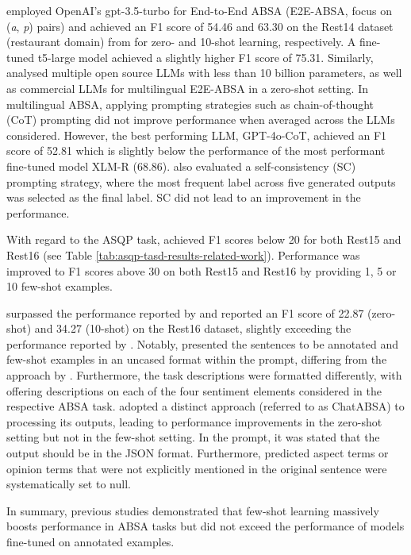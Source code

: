 \citet{zhang2024sentiment} employed OpenAI's gpt-3.5-turbo \citep{brown2020language} for End-to-End ABSA (E2E-ABSA, focus on (\textit{a}, \textit{p}) pairs) and achieved an F1 score of 54.46 and 63.30 on the Rest14 dataset (restaurant domain) from \citet{pontiki2014semeval} for zero- and 10-shot learning, respectively. A fine-tuned t5-large model \citep{raffel2020exploring} achieved a slightly higher F1 score of 75.31. Similarly, \citet{wu2024evaluating} analysed multiple open source LLMs with less than 10 billion parameters, as well as commercial LLMs for multilingual E2E-ABSA in a zero-shot setting. In multilingual ABSA, applying prompting strategies such as chain-of-thought (CoT) prompting did not improve performance when averaged across the LLMs considered. However, the best performing LLM, GPT-4o-CoT, achieved an F1 score of 52.81 which is slightly below the performance of the most performant fine-tuned model XLM-R \citep{conneau2019unsupervised} (68.86). \citet{wu2024evaluating} also evaluated a self-consistency (SC) prompting strategy, where the most frequent label across five generated outputs was selected as the final label. SC did not lead to an improvement in the performance.

With regard to the ASQP task, \citet{zhang2024sentiment} achieved F1 scores below 20 for both Rest15 and Rest16 (see Table \ref{tab:asqp-tasd-results-related-work}). Performance was improved to F1 scores above 30 on both Rest15 and Rest16 by providing 1, 5 or 10 few-shot examples.

\citet{gou2023mvp} surpassed the performance reported by \citet{zhang2024sentiment} and reported an F1 score of 22.87 (zero-shot) and 34.27 (10-shot) on the Rest16 dataset, slightly exceeding the performance reported by \citet{zhang2024sentiment}. Notably, \citet{gou2023mvp} presented the sentences to be annotated and few-shot examples in an uncased format within the prompt, differing from the approach by \citet{zhang2024sentiment}. Furthermore, the task descriptions were formatted differently, with \citet{gou2023mvp} offering descriptions on each of the four sentiment elements considered in the respective ABSA task. \citet{bai2024compound} adopted a distinct approach (referred to as ChatABSA) to processing its outputs, leading to performance improvements in the zero-shot setting but not in the few-shot setting. In the prompt, it was stated that the output should be in the JSON format. Furthermore, predicted aspect terms or opinion terms that were not explicitly mentioned in the original sentence were systematically set to null.

In summary, previous studies demonstrated that few-shot learning massively boosts performance in ABSA tasks but did not exceed the performance of models fine-tuned on annotated examples.